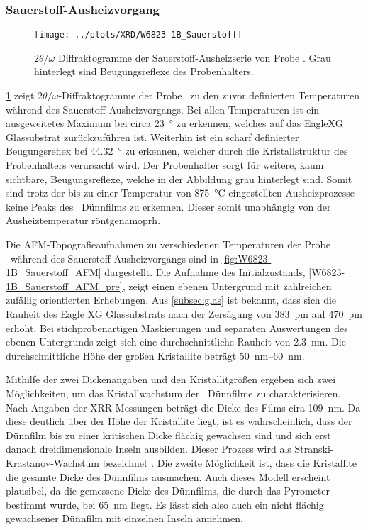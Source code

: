 \subsubsection{Sauerstoff-Ausheizvorgang}\label{subsubsec:W6823-1B_Sauerstoff}
\begin{figure}
    \centering
    \texttt{[image: ../plots/XRD/W6823-1B\_Sauerstoff]}

    \caption{$2\theta/\omega$ Diffraktogramme der Sauerstoff-Ausheizserie von Probe \samplethree.
    Grau hinterlegt sind Beugungsreflexe des Probenhalters.}
    \label{fig:W6823-1B_Sauerstoff_XRD}
\end{figure}
\cref{fig:W6823-1B_Sauerstoff_XRD} zeigt $2\theta/\omega$-Diffraktogramme der Probe \samplethree\ zu den zuvor
definierten Temperaturen während des Sauerstoff-Ausheizvorgangs.
Bei allen Temperaturen ist ein ausgeweitetes Maximum bei circa \qty{23}{\degree} zu erkennen, welches auf
das EagleXG Glassubstrat zurückzuführen ist.
Weiterhin ist ein scharf definierter Beugungsreflex bei \qty{44.32}{\degree} zu erkennen, welcher durch die
Kristallstruktur des Probenhalters verursacht wird.
Der Probenhalter sorgt für weitere, kaum sichtbare, Beugungsreflexe, welche in der Abbildung grau hinterlegt sind.
Somit sind trotz der bis zu einer Temperatur von \qty{875}{\degreeCelsius} eingestellten Ausheizprozesse keine Peaks
des \heo\ Dünnfilms zu erkennen.
Dieser somit unabhängig von der Ausheiztemperatur röntgenamoprh.

Die AFM-Topografieaufnahmen zu verschiedenen Temperaturen der Probe \samplethree\ während des Sauerstoff-Ausheizvorgangs
sind in \cref{fig:W6823-1B_Sauerstoff_AFM} dargestellt.
Die Aufnahme des Initialzustands, \cref{W6823-1B_Sauerstoff_AFM_pre}, zeigt einen ebenen Untergrund mit zahlreichen
zufällig orientierten Erhebungen.
Aus \cref{subsec:glas} ist bekannt, dass sich die Rauheit des Eagle XG Glassubstrats nach der Zersägung von
\qty{383}{\pico\meter} auf \qty{470}{\pico\meter} erhöht.
Bei stichprobenartigen Maskierungen und separaten Auswertungen des ebenen Untergrunds zeigt sich eine durchschnittliche
Rauheit von \qty{2.3}{\nano\meter}.
Die durchschnittliche Höhe der großen Kristallite beträgt \qtyrange{50}{60}{\nano\meter}.

Mithilfe der zwei Dickenangaben und den Kristallitgrößen ergeben sich zwei Möglichkeiten, um das Kristallwachstum
der \heo\ Dünnfilme zu charakterisieren.
Nach Angaben der XRR Messungen beträgt die Dicke des Films cira \qty{109}{\nano\meter}.
Da diese deutlich über der Höhe der Kristallite liegt, ist es wahrscheinlich, dass der Dünnfilm bis zu einer
kritischen Dicke flächig gewachsen sind und sich erst danach dreidimensionale Inseln ausbilden.
Dieser Prozess wird als Stranski-Krastanov-Wachstum bezeichnet \autocite{Lorenz2019}.
Die zweite Möglichkeit ist, dass die Kristallite die gesamte Dicke des Dünnfilms ausmachen.
Auch dieses Modell erscheint plausibel, da die gemessene Dicke des Dünnfilms, die durch das Pyrometer bestimmt wurde,
bei \qty{65}{\nano\meter} liegt.
Es lässt sich also auch ein nicht flächig gewachsener Dünnfilm mit einzelnen Inseln annehmen.

